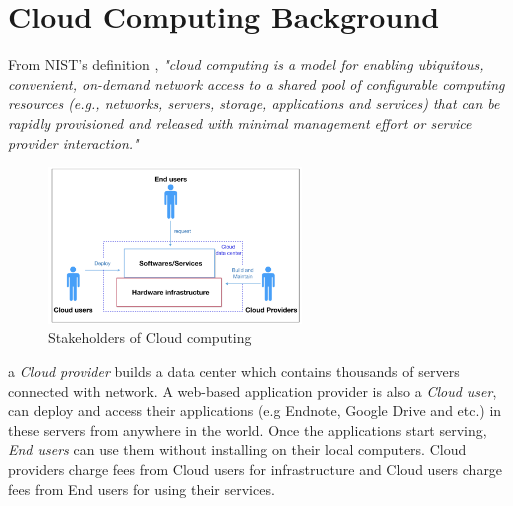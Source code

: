 \section{Cloud Computing Background}
\label{sec:background}


 From NIST's definition \cite{Mell:2011jj}, \textit{"cloud computing is a model for enabling ubiquitous, convenient, on-demand network access to a shared pool of configurable computing resources (e.g., networks, servers, storage, applications and services) that can be rapidly provisioned and released with minimal management effort or service provider interaction."}

\begin{figure}[H]
	\centering
	\includegraphics[width=0.6\textwidth]{pics/stakeholders.png}
	\caption{Stakeholders of Cloud computing \cite{Jennings:2015ht}}
	\label{fig:stakeholders}
\end{figure}

 a \emph{Cloud provider} builds a data center which contains thousands of servers connected with network. 
A web-based application provider is also a \emph{Cloud user}, can deploy and access their applications (e.g Endnote, Google Drive and etc.) in these servers from anywhere in the world. Once the applications start serving, \emph{End users} can use them without installing on their local computers. Cloud providers charge fees from Cloud users for infrastructure and Cloud users charge fees from End users for using their services. 

